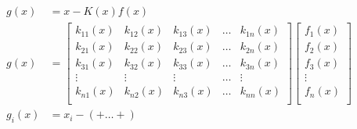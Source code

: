 \documentclass{article}
\begin{document}
\begin{align*}
    g(x) &= x- K(x)f(x)\\
    g(x) &= 
    \begin{bmatrix} 
    k_{11}(x) & k_{12}(x) &  k_{13}(x) & \dots &  k_{1n}(x) \\[1ex]
    k_{21}(x) & k_{22}(x) &  k_{23}(x) & \dots &  k_{2n}(x) \\[1ex]
    k_{31}(x) & k_{32}(x) &  k_{33}(x) & \dots &  k_{3n}(x) \\[1ex]
    \vdots & \vdots & \vdots & \dots & \vdots \\[1ex]
    k_{n1}(x) & k_{n2}(x) &  k_{n3}(x) & \dots &  k_{nn}(x) \\[1ex]
    \end{bmatrix}
    \begin{bmatrix}
    f_1(x)\\[1ex]
    f_2(x)\\[1ex]
    f_3(x)\\[1ex]
    \vdots \\[1ex]
    f_n(x)\\[1ex]
    \end{bmatrix}\\
    g_i(x) &= x_i - ( + \dots + )\\
\end{align*}
\end{document}
